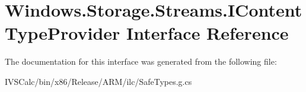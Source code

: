 \hypertarget{interface_windows_1_1_storage_1_1_streams_1_1_i_content_type_provider}{}\section{Windows.\+Storage.\+Streams.\+I\+Content\+Type\+Provider Interface Reference}
\label{interface_windows_1_1_storage_1_1_streams_1_1_i_content_type_provider}


The documentation for this interface was generated from the following file\+:\begin{DoxyCompactItemize}
\item 
I\+V\+S\+Calc/bin/x86/\+Release/\+A\+R\+M/ilc/Safe\+Types.\+g.\+cs\end{DoxyCompactItemize}
